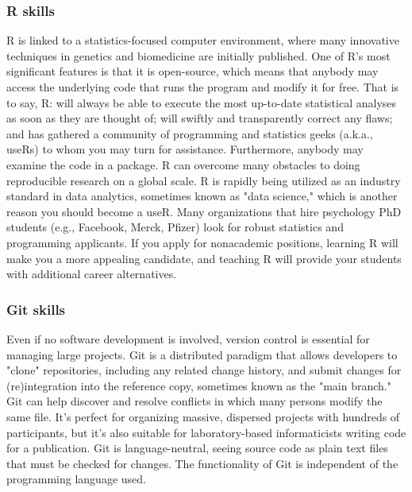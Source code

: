 \documentclass[a4paper, 11pt]{report}
\begin{document}
\subsubsection{R skills}
R is linked to a statistics-focused computer environment, where many innovative techniques in genetics and biomedicine are initially published. \cite{(Pittard & Li, 2020)} One of R's most significant features is that it is open-source, which means that anybody may access the underlying code that runs the program and modify it for free. That is to say, R: will always be able to execute the most up-to-date statistical analyses as soon as they are thought of; will swiftly and transparently correct any flaws; and has gathered a community of programming and statistics geeks (a.k.a., useRs) to whom you may turn for assistance. Furthermore, anybody may examine the code in a package. R can overcome many obstacles to doing reproducible research on a global scale. R is rapidly being utilized as an industry standard in data analytics, sometimes known as "data science," which is another reason you should become a useR. Many organizations that hire psychology PhD students (e.g., Facebook, Merck, Pfizer) look for robust statistics and programming applicants. If you apply for nonacademic positions, learning R will make you a more appealing candidate, and teaching R will provide your students with additional career alternatives. \cite{(Yee, 2017)}\\
\subsubsection{Git skills}
Even if no software development is involved, version control is essential for managing large projects. Git is a distributed paradigm that allows developers to "clone" repositories, including any related change history, and submit changes for (re)integration into the reference copy, sometimes known as the "main branch." Git can help discover and resolve conflicts in which many persons modify the same file. It's perfect for organizing massive, dispersed projects with hundreds of participants, but it's also suitable for laboratory-based informaticists writing code for a publication. Git is language-neutral, seeing source code as plain text files that must be checked for changes. The functionality of Git is independent of the programming language used. \cite{(Pittard & Li, 2020)}\\
\end{document}
